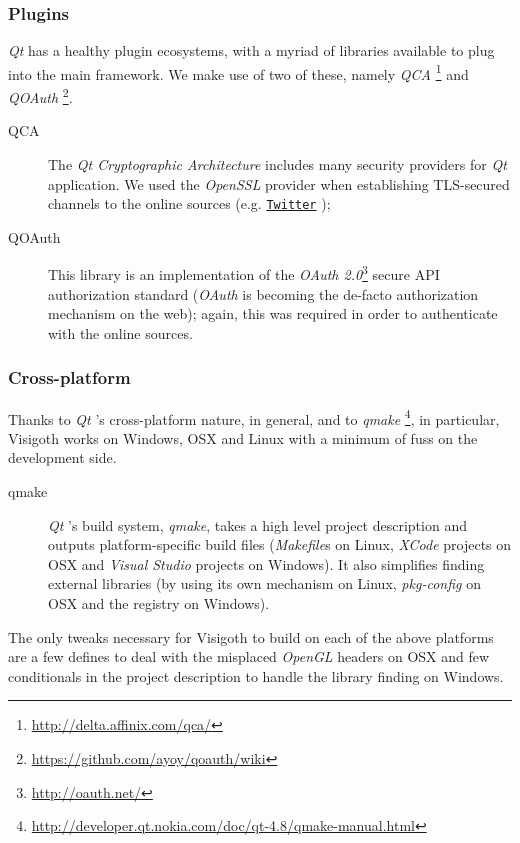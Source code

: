 \documentclass[a4paper,11pt,titlepage]{article}
\let\stdhref\href
\renewcommand{\href}[2]{\stdhref{#1}{\texttt{#2}}}
\newcommand{\buzz}[1]{\emph{#1}}
\newcommand{\Qt}{\buzz{Qt} }
\newcommand{\OpenGL}{\buzz{OpenGL} }
\newcommand{\Twitter}{\href{http://twitter.com}{Twitter} }
\begin{document}
\subsubsection{Plugins}

\Qt has a healthy plugin ecosystems, with a myriad of libraries
available to plug into the main framework. We make use of two of
these, namely
\buzz{QCA} \footnote{\url{http://delta.affinix.com/qca/}} and
\buzz{QOAuth} \footnote{\url{https://github.com/ayoy/qoauth/wiki}}.

\begin{description}
\item [QCA] The \buzz{Qt Cryptographic Architecture} includes many
  security providers for \Qt application. We used the \buzz{OpenSSL}
  provider when establishing TLS-secured channels to the online
  sources (e.g. \Twitter);
\item [QOAuth] This library is an implementation of the \buzz{OAuth
  2.0}\footnote{\url{http://oauth.net/}} secure API authorization
  standard (\buzz{OAuth} is becoming the de-facto authorization
  mechanism on the web); again, this was required in order to
  authenticate with the online sources.
\end{description}

\subsubsection{Cross-platform}

Thanks to \Qt's cross-platform nature, in general, and to
\buzz{qmake} \footnote{\url{http://developer.qt.nokia.com/doc/qt-4.8/qmake-manual.html}},
in particular, Visigoth works on Windows, OSX and Linux with a minimum
of fuss on the development side.

\begin{description}
\item [qmake] \Qt's build system, \buzz{qmake}, takes a high level
  project description and outputs platform-specific build files
  (\buzz{Makefile}s on Linux, \buzz{XCode} projects on OSX and
  \buzz{Visual Studio} projects on Windows). It also simplifies
  finding external libraries (by using its own mechanism on Linux,
  \buzz{pkg-config} on OSX and the registry on Windows).
\end{description}

The only tweaks necessary for Visigoth to build on each of the above
platforms are a few defines to deal with the misplaced \OpenGL headers
on OSX and few conditionals in the project description to handle the
library finding on Windows.
\end{document}
